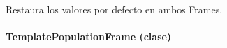 \documentclass[class=report, crop=false]{standalone}
\begin{document}
\begin{fulllineitems}
\begin{fulllineitems}
\end{fulllineitems}

\begin{fulllineitems}

Restaura los valores por defecto en ambos Frames.

\end{fulllineitems}

\end{fulllineitems}

\paragraph{TemplatePopulationFrame (clase)}
\label{sec:a_3_2_4_2}
\end{document}
